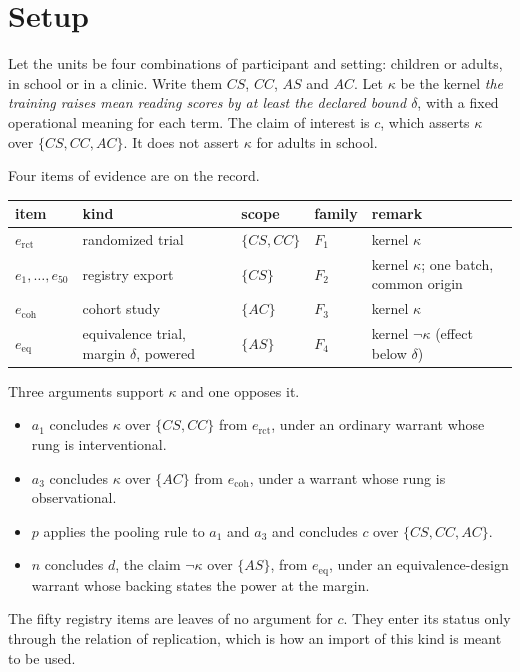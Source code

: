 \documentclass[11pt]{article}
\newcommand{\nk}[1]{\neg #1}
\begin{document}
\section{Setup}\label{sec:setup}

Let the units be four combinations of participant and setting: children or adults, in school or in a clinic. Write them $CS$, $CC$, $AS$ and $AC$. Let $\kappa$ be the kernel \emph{the training raises mean reading scores by at least the declared bound $\delta$}, with a fixed operational meaning for each term. The claim of interest is $c$, which asserts $\kappa$ over $\{CS,CC,AC\}$. It does not assert $\kappa$ for adults in school.

Four items of evidence are on the record.

\begin{center}
\small
\begin{tabularx}{\textwidth}{@{}l l l l X@{}}
\toprule
item & kind & scope & family & remark\\
\midrule
$e_{\mathrm{rct}}$ & randomized trial & $\{CS,CC\}$ & $F_1$ & kernel $\kappa$\\
$e_1,\dots,e_{50}$ & registry export & $\{CS\}$ & $F_2$ & kernel $\kappa$; one batch, common origin\\
$e_{\mathrm{coh}}$ & cohort study & $\{AC\}$ & $F_3$ & kernel $\kappa$\\
$e_{\mathrm{eq}}$ & equivalence trial, margin $\delta$, powered & $\{AS\}$ & $F_4$ & kernel $\nk\kappa$ (effect below $\delta$)\\
\bottomrule
\end{tabularx}
\end{center}

Three arguments support $\kappa$ and one opposes it.
\begin{itemize}[nosep]
\item $a_1$ concludes $\kappa$ over $\{CS,CC\}$ from $e_{\mathrm{rct}}$, under an ordinary warrant whose rung is interventional.
\item $a_3$ concludes $\kappa$ over $\{AC\}$ from $e_{\mathrm{coh}}$, under a warrant whose rung is observational.
\item $p$ applies the pooling rule to $a_1$ and $a_3$ and concludes $c$ over $\{CS,CC,AC\}$.
\item $n$ concludes $d$, the claim $\nk\kappa$ over $\{AS\}$, from $e_{\mathrm{eq}}$, under an equivalence-design warrant whose backing states the power at the margin.
\end{itemize}
The fifty registry items are leaves of no argument for $c$. They enter its status only through the relation of replication, which is how an import of this kind is meant to be used.
\end{document}
